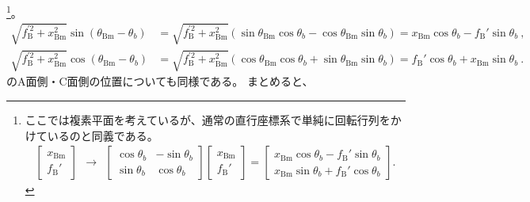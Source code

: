 \footnote{ここでは複素平面を考えているが、通常の直行座標系で単純に回転行列をかけているのと同義である。
\begin{align*}
  \left[
    \begin{array}{c}
      x_\mathrm{Bm}\\
      f_\mathrm B'
    \end{array}
  \right]
  ~~\longrightarrow~~
  \left[
    \begin{array}{cc}
      \cos\theta_b & -\sin\theta_b\\
      \sin\theta_b & \cos\theta_b
    \end{array}
  \right]\!\!
  \left[
    \begin{array}{c}
      x_\mathrm{Bm}\\
      f_\mathrm B'
    \end{array}
  \right]
  = \left[
    \begin{array}{c}
      x_\mathrm{Bm}\cos\theta_b-f_\mathrm B'\sin\theta_b\\
      x_\mathrm{Bm}\sin\theta_b+f_\mathrm B'\cos\theta_b
    \end{array}
  \right].
\end{align*}%
}。
\begin{align*}
  \sqrt{f_\mathrm B^{'2}+x_\mathrm{Bm}^2}\sin(\theta_\mathrm{Bm}-\theta_b)
  &= \sqrt{f_\mathrm B^{'2}+x_\mathrm{Bm}^2}(\sin\theta_\mathrm{Bm}\cos\theta_b-\cos\theta_\mathrm{Bm}\sin\theta_b)
   = x_\mathrm{Bm}\cos\theta_b-f_\mathrm B'\sin\theta_b~,\\
  \sqrt{f_\mathrm B^{'2}+x_\mathrm{Bm}^2}\cos(\theta_\mathrm{Bm}-\theta_b)
  &= \sqrt{f_\mathrm B^{'2}+x_\mathrm{Bm}^2}(\cos\theta_\mathrm{Bm}\cos\theta_b+\sin\theta_\mathrm{Bm}\sin\theta_b)
   = f_\mathrm B'\cos\theta_b+x_\mathrm{Bm}\sin\theta_b~.
\end{align*}
\BottomEndFace のA面側・C面側の位置についても同様である。
まとめると、
